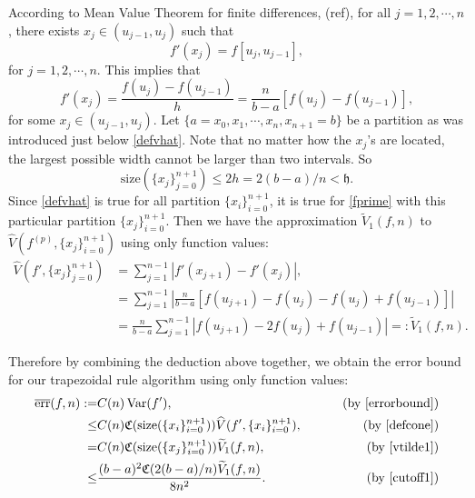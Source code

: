 \documentclass{iitthesis}
\DeclareMathOperator{\Var}{Var}
\theoremstyle{definition}
\theoremstyle{remark}
\begin{document}
According to Mean Value Theorem for finite differences, (ref), for all $j=1,2,\cdots,n$, there exists $x_j\in (u_{j-1},u_{j})$ such that
\begin{equation*}
   f'(x_j)= f[u_{j},u_{j-1}],
\end{equation*}
for $j = 1, 2, \cdots, n.$ This implies that
\begin{equation}\label{fprime}
  f'(x_j)=\frac{f(u_{j})-f(u_{j-1})}{h}=\frac{n}{b-a}[f(u_{j})-f(u_{j-1})],
\end{equation}
for some $x_j\in (u_{j-1},u_{j})$. Let $\{a=x_{0}, x_{1},\cdots,x_{n},x_{n+1}=b\}$ be a partition as was introduced just below \eqref{defvhat}. Note that no matter how the $x_j$'s are located, the largest possible width cannot be larger than two intervals. So
\begin{equation}\label{cutoff1}
  \text{size}(\{x_j\}_{j=0}^{n+1})\leq 2h=2(b-a)/n<\mathfrak{h}.
\end{equation}
Since \eqref{defvhat} is true for all partition $\{x_i\}_{i=0}^{n+1}$, it is true for \eqref{fprime} with this particular partition $\{x_j\}_{i=0}^{n+1}$. Then we have the approximation $\widetilde{V}_1(f,n)$ to $\widehat{V}(f^{(p)},\{x_j\}_{i=0}^{n+1})$ using only function values:
\begin{align}\label{vtilde1}
\nonumber    \widehat{V}(f',\{x_j\}_{j=0}^{n+1})&= \sum_{j=1}^{n-1}\left|f'(x_{j+1})-f'(x_{j})\right|,\\
\nonumber    &=\sum_{j=1}^{n-1}\left|\frac{n}{b-a}[f(u_{j+1})-f(u_{j})-f(u_{j})+f(u_{j-1})]\right|\\
    &=\frac{n}{b-a}\sum_{j=1}^{n-1}\left|f(u_{j+1})-2f(u_{j})+f(u_{j-1})\right|=:\widetilde{V}_1(f,n).
\end{align}

Therefore by combining the deduction above together, we obtain the error bound for our trapezoidal rule algorithm using only function values:
\begin{align*}
\overline{\text{err}}(f,n):=&C(n)\Var(f'),\qquad &\text{ (by \eqref{errorbound})}\\
\leq & C(n)\mathfrak{C}(\text{size}(\{x_i\}_{i=0}^{n+1}))\widehat{V}(f',\{x_i\}_{i=0}^{n+1}), \qquad &\text{ (by \eqref{defcone})}\\
=& C(n)\mathfrak{C}(\text{size}(\{x_j\}_{i=0}^{n+1}))\widetilde{V}_1(f,n), \qquad &\text{ (by \eqref{vtilde1})}\\
  \leq & \frac{(b-a)^2\mathfrak{C}(2(b-a)/n)\widetilde{V}_1(f,n)}{8n^2}.\qquad &\text{ (by \eqref{cutoff1})}
\end{align*}
\end{document}

